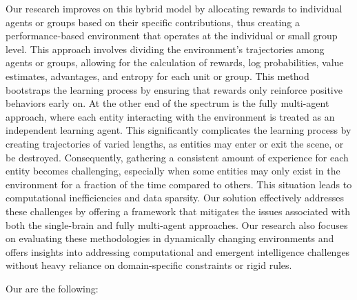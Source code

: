 \noindent Our research improves on this hybrid model by allocating rewards to individual agents or groups based on their specific contributions, thus creating a performance-based environment that operates at the individual or small group level. This approach involves dividing the environment's trajectories among agents or groups, allowing for the calculation of rewards, log probabilities, value estimates, advantages, and entropy for each unit or group. This method bootstraps the learning process by ensuring that rewards only reinforce positive behaviors early on. At the other end of the spectrum is the fully multi-agent approach, where each entity interacting with the environment is treated as an independent learning agent. This significantly complicates the learning process by creating trajectories of varied lengths, as entities may enter or exit the scene, or be destroyed. Consequently, gathering a consistent amount of experience for each entity becomes challenging, especially when some entities may only exist in the environment for a fraction of the time compared to others. This situation leads to computational inefficiencies and data sparsity. Our solution effectively addresses these challenges by offering a framework that mitigates the issues associated with both the single-brain and fully multi-agent approaches. Our research also focuses on evaluating these methodologies in dynamically changing environments and offers insights into addressing computational and emergent intelligence challenges without heavy reliance on domain-specific constraints or rigid rules.

\bigskip

\noindent Our  are the following:

